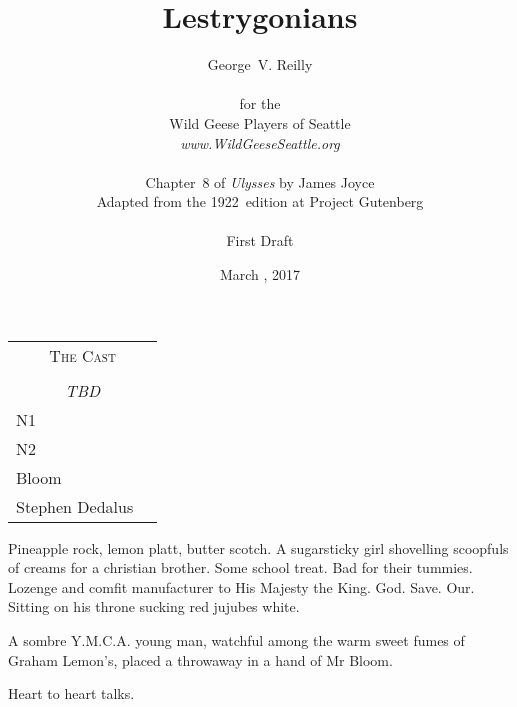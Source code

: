 


\title{\Huge Lestrygonians}
\author{George~V. Reilly\\
\\
{\small for the}\\
Wild Geese Players of Seattle\\
{\emph{www.WildGeeseSeattle.org}}\\
\\
{\small Chapter~8 of \emph{Ulysses} by James Joyce}\\
{\small Adapted from the 1922~edition at Project Gutenberg}
\\
\\
{\small First Draft}}
\date{March , 2017}
\raggedbottom



\maketitle
\thispagestyle{empty}
\pagebreak

\begin{tabular}{lp{10cm}}
    \multicolumn{2}{c}{\Large \textsc{The Cast}} \\
\\
    \multicolumn{2}{c}{\large \textit{TBD}} \\
N1 \\
N2 \\
Bloom \\
Stephen Dedalus \\
\end{tabular}

\thispagestyle{empty}
\newpage


\setcounter{page}{1}

Pineapple rock, lemon platt, butter scotch. A sugarsticky girl
shovelling scoopfuls of creams for a christian brother. Some school treat.
Bad for their tummies. Lozenge and comfit manufacturer to His Majesty
the King. God. Save. Our. Sitting on his throne sucking red jujubes white.

A sombre Y.M.C.A. young man, watchful among the warm sweet
fumes of Graham Lemon's, placed a throwaway in a hand of Mr Bloom.

Heart to heart talks.

